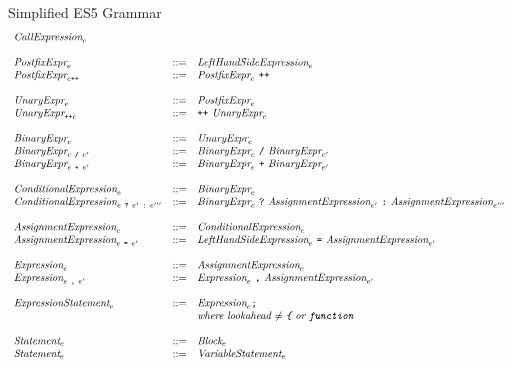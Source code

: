 \documentclass[preprint,10pt]{sigplanconf}
\begin{document}
\begin{displayfigure*}{\label{fig:grammar}Simplified ES5 Grammar}
\[\begin{array}{lcl}
  \textit{CallExpression}_{e}
  \\ \\
  \textit{PostfixExpr}_{e} &::=&
  \textit{LeftHandSideExpression}_{e}
  \\
  \textit{PostfixExpr}_{e\texttt{++}} &::=&
  \textit{PostfixExpr}_{e}~\texttt{++}
  \\ \\
  \textit{UnaryExpr}_{e} &::=&
  \textit{PostfixExpr}_{e}
  \\
  \textit{UnaryExpr}_{\texttt{++}e} &::=&
  \texttt{++}~\textit{UnaryExpr}_{e}
  \\ \\
  \textit{BinaryExpr}_{e} &::=& \textit{UnaryExpr}_{e} \\
  \textit{BinaryExpr}_{e ~\texttt{/}~ e'}
  &::=&
  \textit{BinaryExpr}_{e} ~\texttt{/}~ \textit{BinaryExpr}_{e'} \\
  \textit{BinaryExpr}_{e ~\texttt{+}~ e'}
  &::=&
  \textit{BinaryExpr}_{e} ~\texttt{+}~ \textit{BinaryExpr}_{e'}
  \\ \\
  \textit{ConditionalExpression}_{e} &::=&
  \textit{BinaryExpr}_{e}
  \\
  \textit{ConditionalExpression}_{e~\texttt{?}~e'~\texttt{:}~e'''} &::=&
  \textit{BinaryExpr}_{e}~\texttt{?}~\textit{AssignmentExpression}_{e'}
  ~\texttt{:}~\textit{AssignmentExpression}_{e'''}
  \\ \\
  \textit{AssignmentExpression}_{e} &::=&
  \textit{ConditionalExpression}_{e}
  \\
  \textit{AssignmentExpression}_{e~\texttt{=}~e'} &::=&
  \textit{LeftHandSideExpression}_{e}~\texttt{=}~
  \textit{AssignmentExpression}_{e'}
  \\ \\
  \textit{Expression}_{e} &::=&
  \textit{AssignmentExpression}_{e}
  \\
  \textit{Expression}_{e~\texttt{,}~e'} &::=&
  \textit{Expression}_{e}~\texttt{,}~
  \textit{AssignmentExpression}_{e'}
  \\ \\
  \textit{ExpressionStatement}_{e} &::=&
  \textit{Expression}_{e} \texttt{;}
  \\ 
  &&  \textit{where lookahead \( \not =
    \texttt{\{} \) or \( \texttt{function} \)}
  \\ \\
  \textit{Statement}_{e} &::=& \textit{Block}_{e}
  \\
  \textit{Statement}_{e} &::=& \textit{VariableStatement}_{e}
  \\

\end{array}\]
\end{displayfigure*}
\end{document}
